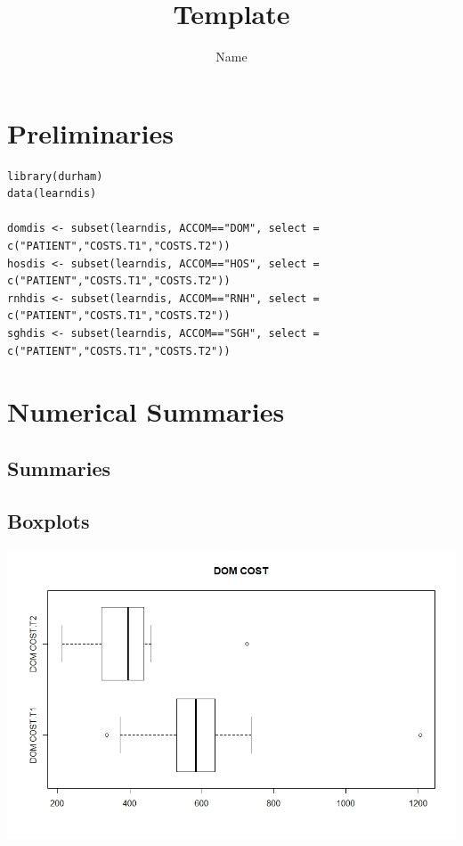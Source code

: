 \documentclass[]{article}
\title{Template}
\author{Name}
\begin{document}
\maketitle
\section{Preliminaries}
\begin{lstlisting}
library(durham)
data(learndis)

domdis <- subset(learndis, ACCOM=="DOM", select = c("PATIENT","COSTS.T1","COSTS.T2"))
hosdis <- subset(learndis, ACCOM=="HOS", select = c("PATIENT","COSTS.T1","COSTS.T2"))
rnhdis <- subset(learndis, ACCOM=="RNH", select = c("PATIENT","COSTS.T1","COSTS.T2"))
sghdis <- subset(learndis, ACCOM=="SGH", select = c("PATIENT","COSTS.T1","COSTS.T2"))
\end{lstlisting}
\section{Numerical Summaries}
\subsection{Summaries}

\subsection{Boxplots}

\centering
\includegraphics[width=\textwidth]{RStudio/jpeg/Box_DOM.jpeg}
\raggedright
\end{document}
